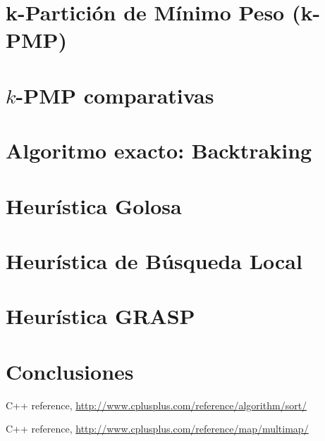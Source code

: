 \documentclass[11pt,a4paper]{article}
\begin{document}
\thispagestyle{empty}
\maketitle
\tableofcontents

\newpage
\section{k-Partici\'on de M\'inimo Peso (k-PMP)}


\newpage
\section{$k$-PMP comparativas}


\newpage
\section{Algoritmo exacto: Backtraking}


\newpage
\section{Heur\'istica Golosa}


\newpage
\section{Heur\'istica de B\'usqueda Local}


\newpage
\section{Heur\'istica GRASP}


\newpage
\section{Conclusiones}


\newpage
\begin{thebibliography}{2}

  C++ reference,
  \url{http://www.cplusplus.com/reference/algorithm/sort/}
 

	C++ reference,
	\url{http://www.cplusplus.com/reference/map/multimap/}
  
\end{thebibliography}
\end{document}
